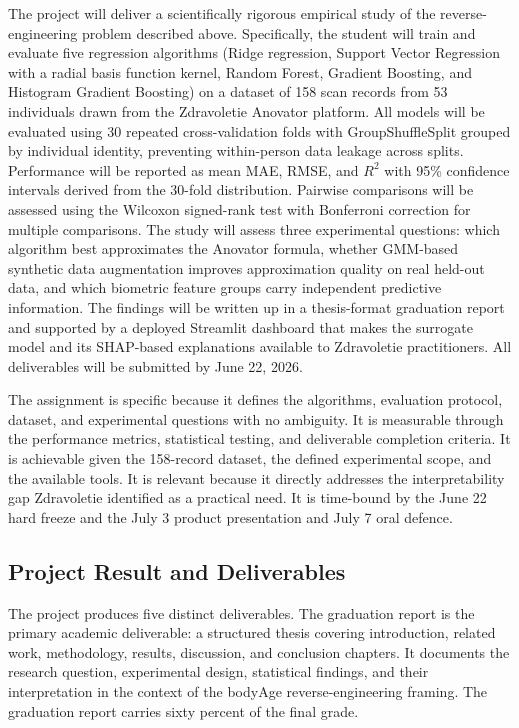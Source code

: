 \documentclass[11pt,a4paper]{article}
\begin{document}
The project will deliver a scientifically rigorous empirical study of the reverse-engineering problem described above. Specifically, the student will train and evaluate five regression algorithms (Ridge regression, Support Vector Regression with a radial basis function kernel, Random Forest, Gradient Boosting, and Histogram Gradient Boosting) on a dataset of 158 scan records from 53 individuals drawn from the Zdravoletie Anovator platform. All models will be evaluated using 30 repeated cross-validation folds with GroupShuffleSplit grouped by individual identity, preventing within-person data leakage across splits. Performance will be reported as mean MAE, RMSE, and $R^2$ with 95\% confidence intervals derived from the 30-fold distribution. Pairwise comparisons will be assessed using the Wilcoxon signed-rank test with Bonferroni correction for multiple comparisons. The study will assess three experimental questions: which algorithm best approximates the Anovator formula, whether GMM-based synthetic data augmentation improves approximation quality on real held-out data, and which biometric feature groups carry independent predictive information. The findings will be written up in a thesis-format graduation report and supported by a deployed Streamlit dashboard that makes the surrogate model and its SHAP-based explanations available to Zdravoletie practitioners. All deliverables will be submitted by June 22, 2026.

The assignment is specific because it defines the algorithms, evaluation protocol, dataset, and experimental questions with no ambiguity. It is measurable through the performance metrics, statistical testing, and deliverable completion criteria. It is achievable given the 158-record dataset, the defined experimental scope, and the available tools. It is relevant because it directly addresses the interpretability gap Zdravoletie identified as a practical need. It is time-bound by the June 22 hard freeze and the July 3 product presentation and July 7 oral defence.

\subsection{Project Result and Deliverables}

The project produces five distinct deliverables. The graduation report is the primary academic deliverable: a structured thesis covering introduction, related work, methodology, results, discussion, and conclusion chapters. It documents the research question, experimental design, statistical findings, and their interpretation in the context of the bodyAge reverse-engineering framing. The graduation report carries sixty percent of the final grade.
\end{document}
